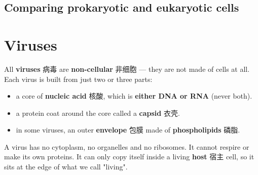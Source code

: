 \documentclass[11pt]{article}
\begin{document}
\subsection*{Comparing prokaryotic and eukaryotic cells}

\begin{center}
\end{center}

\section*{Viruses}

All \textbf{viruses} 病毒 are \textbf{non-cellular} 非细胞 — they are not made of cells at all. Each virus is built from just two or three parts:

\begin{itemize}
\item a core of \textbf{nucleic acid} 核酸, which is \textbf{either DNA or RNA} (never both).

\item a protein coat around the core called a \textbf{capsid} 衣壳.

\item in some viruses, an outer \textbf{envelope} 包膜 made of \textbf{phospholipids} 磷脂.

\end{itemize}

A virus has no cytoplasm, no organelles and no ribosomes. It cannot respire or make its own proteins. It can only copy itself inside a living \textbf{host} 宿主 cell, so it sits at the edge of what we call "living".
\end{document}
